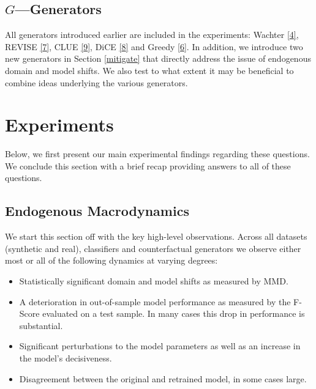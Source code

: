 \documentclass[conference,final,]{IEEEtran}
\providecommand{\tightlist}{%
  \setlength{\itemsep}{0pt}\setlength{\parskip}{0pt}}
\theoremstyle{definition}
\theoremstyle{definition}
\theoremstyle{definition}
\theoremstyle{definition}
\theoremstyle{remark}
\begin{document}
\hypertarget{ggenerators}{%
\subsection{\texorpdfstring{\(G\)---Generators}{G---Generators}}\label{ggenerators}}

All generators introduced earlier are included in the experiments: Wachter \protect\hyperlink{ref-wachter2017counterfactual}{{[}4{]}}, REVISE \protect\hyperlink{ref-joshi2019realistic}{{[}7{]}}, CLUE \protect\hyperlink{ref-antoran2020getting}{{[}9{]}}, DiCE \protect\hyperlink{ref-mothilal2020explaining}{{[}8{]}} and Greedy \protect\hyperlink{ref-schut2021generating}{{[}6{]}}. In addition, we introduce two new generators in Section \ref{mitigate} that directly address the issue of endogenous domain and model shifts. We also test to what extent it may be beneficial to combine ideas underlying the various generators.

\hypertarget{empirical-2}{%
\section{Experiments}\label{empirical-2}}

Below, we first present our main experimental findings regarding these questions. We conclude this section with a brief recap providing answers to all of these questions.

\hypertarget{endogenous-macrodynamics}{%
\subsection{Endogenous Macrodynamics}\label{endogenous-macrodynamics}}

We start this section off with the key high-level observations. Across all datasets (synthetic and real), classifiers and counterfactual generators we observe either most or all of the following dynamics at varying degrees:

\begin{itemize}
\tightlist
\item
  Statistically significant domain and model shifts as measured by MMD.
\item
  A deterioration in out-of-sample model performance as measured by the F-Score evaluated on a test sample. In many cases this drop in performance is substantial.
\item
  Significant perturbations to the model parameters as well as an increase in the model's decisiveness.
\item
  Disagreement between the original and retrained model, in some cases large.
\end{itemize}
\end{document}
